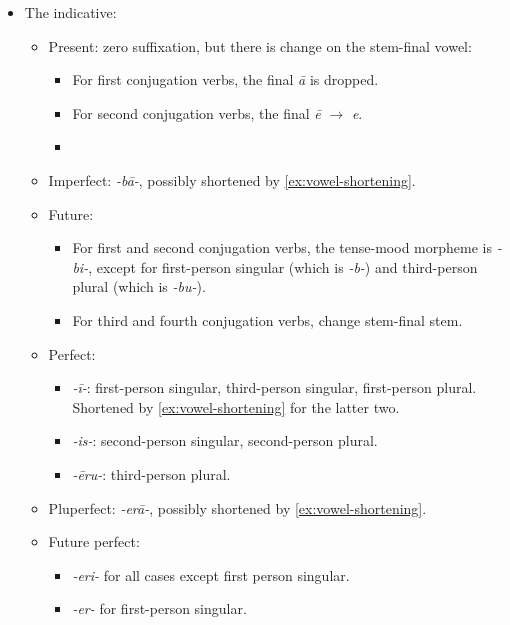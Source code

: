 \documentclass{article}
\newcommand*{\corpus}[1]{\emph{#1}}
\begin{document}
\begin{itemize}
    \item The indicative:
    \begin{itemize}
        \item Present: zero suffixation, but there is change on the stem-final vowel:
        \begin{itemize}
            \item For first conjugation verbs, the final \corpus{\={a}} is dropped.
            \item For second conjugation verbs, the final \corpus{\={e}} $\to$ \corpus{e}.
            \item  
        \end{itemize}
        \item Imperfect: \corpus{-b\={a}-}, possibly shortened by \eqref{ex:vowel-shortening}.
        \item Future: 
        \begin{itemize}
            \item For first and second conjugation verbs, 
            the tense-mood morpheme is \corpus{-bi-}, except for 
            first-person singular (which is \corpus{-b-})
            and third-person plural (which is \corpus{-bu-}).
            \item For third and fourth conjugation verbs, change stem-final stem.
        \end{itemize}
        \item Perfect: 
        \begin{itemize}
            \item \corpus{-ī-}: first-person singular, third-person singular, first-person plural.
            Shortened by \eqref{ex:vowel-shortening} for the latter two.
            \item \corpus{-is-}: second-person singular, second-person plural.
            \item \corpus{-\={e}ru-}: third-person plural.
        \end{itemize}
        \item Pluperfect: \corpus{-er\={a}-}, possibly shortened by \eqref{ex:vowel-shortening}.
        \item Future perfect: 
        \begin{itemize}
            \item \corpus{-eri-} for all cases except first person singular.
            \item \corpus{-er-} for first-person singular.
        \end{itemize}

\end{itemize}
\end{itemize}
\end{document}
